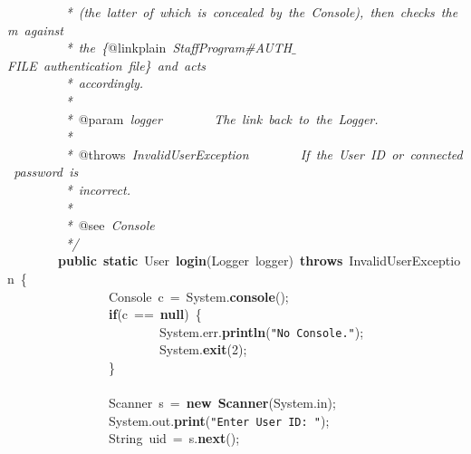 \mbox{}\textit{\ \ \ \ \ \ \ \ \ *\ (the\ latter\ of\ which\ is\ concealed\ by\ the\ Console),\ then\ checks\ them\ against} \\
\mbox{}\textit{\ \ \ \ \ \ \ \ \ *\ the\ \{}@linkplain\textit{\ StaffProgram\#AUTH$\_$FILE\ authentication\ file\}\ and\ acts\ } \\
\mbox{}\textit{\ \ \ \ \ \ \ \ \ *\ accordingly.} \\
\mbox{}\textit{\ \ \ \ \ \ \ \ \ *} \\
\mbox{}\textit{\ \ \ \ \ \ \ \ \ *\ }@param\textit{\ logger\ \ \ \ \ \ \ \ The\ link\ back\ to\ the\ Logger.} \\
\mbox{}\textit{\ \ \ \ \ \ \ \ \ *} \\
\mbox{}\textit{\ \ \ \ \ \ \ \ \ *\ }@throws\textit{\ InvalidUserException\ \ \ \ \ \ \ \ If\ the\ User\ ID\ or\ connected\ password\ is\ } \\
\mbox{}\textit{\ \ \ \ \ \ \ \ \ *\ incorrect.} \\
\mbox{}\textit{\ \ \ \ \ \ \ \ \ *} \\
\mbox{}\textit{\ \ \ \ \ \ \ \ \ *\ }@see\textit{\ Console} \\
\mbox{}\textit{\ \ \ \ \ \ \ \ \ */} \\
\mbox{}\ \ \ \ \ \ \ \ \textbf{public}\ \textbf{static}\ User\ \textbf{login}(Logger\ logger)\ \textbf{throws}\ InvalidUserException\ \{ \\
\mbox{}\ \ \ \ \ \ \ \ \ \ \ \ \ \ \ \ Console\ c\ =\ System.\textbf{console}(); \\
\mbox{}\ \ \ \ \ \ \ \ \ \ \ \ \ \ \ \ \textbf{if}(c\ ==\ \textbf{null})\ \{ \\
\mbox{}\ \ \ \ \ \ \ \ \ \ \ \ \ \ \ \ \ \ \ \ \ \ \ \ System.err.\textbf{println}(\texttt{"{}No\ Console."{}}); \\
\mbox{}\ \ \ \ \ \ \ \ \ \ \ \ \ \ \ \ \ \ \ \ \ \ \ \ System.\textbf{exit}(2); \\
\mbox{}\ \ \ \ \ \ \ \ \ \ \ \ \ \ \ \ \} \\
\mbox{}\ \ \ \ \ \ \ \ \ \ \ \ \ \ \ \  \\
\mbox{}\ \ \ \ \ \ \ \ \ \ \ \ \ \ \ \ Scanner\ s\ =\ \textbf{new}\ \textbf{Scanner}(System.in); \\
\mbox{}\ \ \ \ \ \ \ \ \ \ \ \ \ \ \ \ System.out.\textbf{print}(\texttt{"{}Enter\ User\ ID:\ "{}}); \\
\mbox{}\ \ \ \ \ \ \ \ \ \ \ \ \ \ \ \ String\ uid\ =\ s.\textbf{next}(); \\
\mbox{}\ \ \ \ \ \ \ \ \ \ \ \ \ \ \ \  \\
